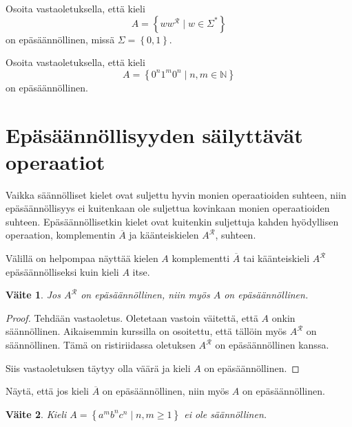 \documentclass[a4paper,11pt]{article}
\newtheorem*{claim}{Väite}
\theoremstyle{definition}
\newcommand{\set}[1]{{\left\{ #1 \right\}}}
\newcommand{\Nat}{\mathbb{N}}
\begin{document}
\begin{exercise}
    Osoita vastaoletuksella, että kieli 
    \begin{equation*}
        A = \set{ww^{\mathcal{R}} \mid w \in \Sigma^*}
    \end{equation*}
    on epäsäännöllinen, missä $\Sigma = \set{0,1}$.
\end{exercise}

\begin{exercise}
    Osoita vastaoletuksella, että kieli
    \begin{equation*}
        A = \set{0^n1^m0^n \mid n,m \in \Nat}
    \end{equation*}
    on epäsäännöllinen.
\end{exercise}

\section*{Epäsäännöllisyyden säilyttävät operaatiot}

Vaikka säännölliset kielet ovat suljettu hyvin monien operaatioiden suhteen,
niin epäsäännöllisyys ei kuitenkaan ole suljettua kovinkaan monien
operaatioiden suhteen. Epäsään\-nöl\-lisetkin kielet ovat kuitenkin suljettuja
kahden hyödyllisen operaation, komplementin $\overline{A}$ ja käänteiskielen
$A^\mathcal{R}$, suhteen.

Välillä on helpompaa näyttää kielen $A$ komplementti $\overline{A}$ tai
käänteiskieli $A^\mathcal{R}$ epäsäännölliseksi kuin kieli $A$ itse.

\begin{claim}
    Jos $A^\mathcal{R}$ on epäsäännöllinen, niin myös $A$ on
    epä\-sään\-nöl\-li\-nen.
\end{claim}
\begin{proof}
    Tehdään vastaoletus. Oletetaan vastoin väitettä, et\-tä $A$ onkin
    säännöllinen. Aikaisemmin kurssilla on osoitettu, että tällöin myös
    $A^\mathcal{R}$ on säännöllinen. Tämä on ristiriidassa oletuksen
    $A^\mathcal{R}$ on epäsäännöllinen kanssa.

    Siis vastaoletuksen täytyy olla väärä ja kieli $A$ on epä\-sään\-nöl\-li\-nen.
\end{proof}

\begin{exercise}
    Näytä, että jos kieli $\overline{A}$ on epä\-sään\-nöl\-li\-nen, niin myös $A$ on
    epäsäännöllinen.
\end{exercise}

\begin{claim}
    Kieli $A = \set{a^m b^n c^n \mid n,m\geq 1}$ ei ole säännöllinen.
\end{claim}
\end{document}
